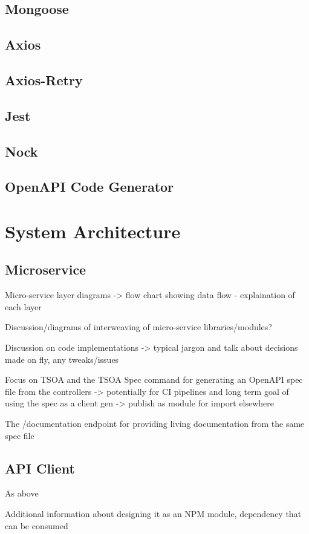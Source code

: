     \subsection{Mongoose}
    \subsection{Axios}
    \subsection{Axios-Retry}
    \subsection{Jest}
    \subsection{Nock}
    \subsection{OpenAPI Code Generator}
    
\section{System Architecture}
\subsection{Microservice}
Micro-service layer diagrams -> flow chart showing data flow - explaination of each layer

Discussion/diagrams of interweaving of micro-service libraries/modules?

Discussion on code implementations -> typical jargon and talk about decisions made on fly, any tweaks/issues

Focus on TSOA and the TSOA Spec command for generating an OpenAPI spec file from the controllers -> potentially for CI pipelines and long term goal of using the spec as a client gen -> publish as module for import elsewhere

The /documentation endpoint for providing living documentation from the same spec file

\subsection{API Client}
As above

Additional information about designing it as an NPM module, dependency that can be consumed 

